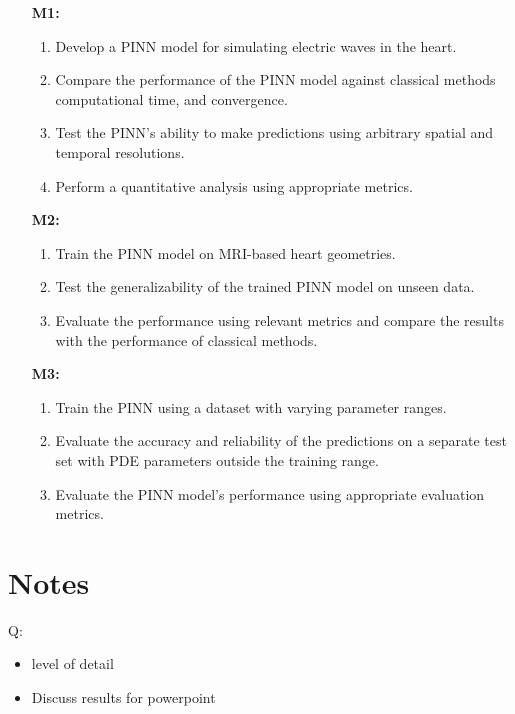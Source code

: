\documentclass{article}
\begin{document}
\begin{methodbox}

\begin{enumerate}
\item[\textbf{M1:}] 
    \begin{enumerate}
        \item Develop a PINN model for simulating electric waves in the heart.
        \item Compare the performance of the PINN model against classical methods computational time, and convergence.
        \item Test the PINN's ability to make predictions using arbitrary spatial and temporal resolutions. 
        \item Perform a quantitative analysis using appropriate metrics.
    \end{enumerate}

\item[\textbf{M2:}] 
    \begin{enumerate}
        \item Train the PINN model on MRI-based heart geometries.
        \item Test the generalizability of the trained PINN model on unseen data.
        \item Evaluate the performance using relevant metrics and compare the results with the performance of classical methods.
    \end{enumerate}

\item[\textbf{M3:}] 
    \begin{enumerate}
        \item Train the PINN using a dataset with varying parameter ranges.
        \item Evaluate the accuracy and reliability of the predictions on a separate test set with PDE parameters outside the training range.
        \item Evaluate the PINN model's performance using appropriate evaluation metrics.
    \end{enumerate}
\end{enumerate}
\end{methodbox}

\newpage
\section{Notes}
Q:
\begin{itemize}
    \item level of detail 
    \item Discuss results for powerpoint
    
     
\end{itemize}
\end{document}
